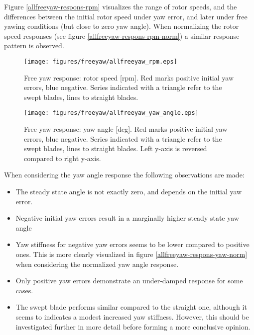 \documentclass[a4paper]{jpconf}
\begin{document}
Figure \ref{allfreeyaw-respons-rpm} visualizes the range of rotor speeds, and the differences between the initial rotor speed under yaw error, and later under free yawing conditions (but close to zero yaw angle). When normalizing the rotor speed responses (see figure \ref{allfreeyaw-respons-rpm-norm}) a similar response pattern is observed. 

\begin{figure}[h]
\begin{minipage}{\textwidth}
\centering
\texttt{[image: figures/freeyaw/allfreeyaw\_rpm.eps]}
\caption{\label{allfreeyaw-respons-rpm} Free yaw response: rotor speed [rpm]. Red marks positive initial yaw errors, blue negative. Series indicated with a triangle refer to the swept blades, lines to straight blades.}
\end{minipage}
\begin{minipage}{\textwidth}
\centering
\texttt{[image: figures/freeyaw/allfreeyaw\_yaw\_angle.eps]}
\caption{\label{allfreeyaw-respons-yaw} Free yaw response: yaw angle [deg]. Red marks positive initial yaw errors, blue negative. Series indicated with a triangle refer to the swept blades, lines to straight blades. Left y-axis is reversed compared to right y-axis.}
\end{minipage} 
\end{figure}

When considering the yaw angle response the following observations are made:

\begin{itemize}
	\item The steady state angle is not exactly zero, and depends on the initial yaw error.
	\item Negative initial yaw errors result in a marginally higher steady state yaw angle
	\item Yaw stiffness for negative yaw errors seems to be lower compared to positive ones. This is more clearly visualized in figure \ref{allfreeyaw-respons-yaw-norm} when considering the normalized yaw angle response.
	\item Only positive yaw errors demonstrate an under-damped response for some cases.
	\item The swept blade performs similar compared to the straight one, although it seems to indicates a modest increased yaw stiffness. However, this should be investigated further in more detail before forming a more conclusive opinion.
\end{itemize}
\end{document}
